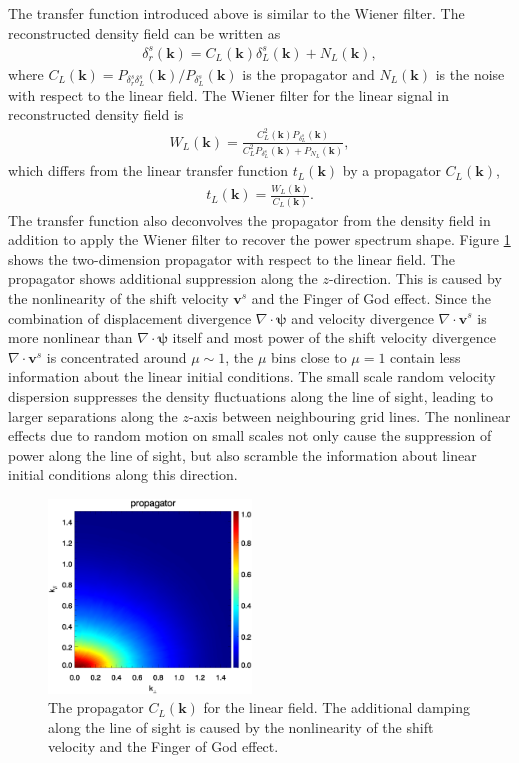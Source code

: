 \documentclass[aps,prd,twocolumn,superscriptaddress,groupedaddress,nofootinbib,amsfont]{revtex4}  %
\newcommand{\bea}{\begin{eqnarray}}
\newcommand{\eea}{\end{eqnarray}}
\newcommand{\bmp}{\bm{\psi}}
\newcommand{\bmv}{\bm{v}}
\newcommand{\bmk}{\bm{k}}
\begin{document}
The transfer function introduced above is similar to the Wiener filter. 
The reconstructed density field can be written as 
\bea
\delta_r^s(\bmk)=C_L(\bmk)\delta_L^s(\bmk)+N_L(\bmk),
\eea
where $C_L(\bmk)=P_{\delta_r^s\delta_L^s}(\bmk)/P_{\delta_L^s}(\bmk)$ is the 
propagator and $N_L(\bmk)$ is the noise with respect to the linear field. 
The Wiener filter for the linear signal in reconstructed density field is 
\bea
W_L(\bmk)=\frac{C^2_L(\bmk)P_{\delta_L^s}(\bmk)}{C_L^2P_{\delta^s_L}(\bmk)+P_{N_L}(\bmk)},
\eea
which differs from the linear transfer function $t_L(\bmk)$ by a propagator 
$C_L(\bmk)$,
\bea
t_L(\bmk)=\frac{W_L(\bmk)}{C_L(\bmk)}.
\eea
The transfer function also deconvolves the propagator from the density field 
in addition to apply the Wiener filter to recover the power spectrum shape.
Figure \ref{fig:tf_Ls} shows the two-dimension propagator with respect to the
linear field. 
The propagator shows additional suppression along the $z$-direction. 
This is caused by the nonlinearity of the shift velocity $\bmv^s$ and the Finger of God effect. Since the combination of displacement divergence $\nabla\cdot\bmp$ and velocity divergence $\nabla\cdot\bmv^s$ is more nonlinear than $\nabla\cdot\bmp$ itself and most power of the shift velocity divergence $\nabla\cdot\bmv^s$ is concentrated around $\mu\sim1$, the $\mu$ bins close to $\mu=1$ contain
less information about the linear initial conditions.
The small scale random velocity dispersion suppresses the density fluctuations
along the line of sight, leading to larger separations along the $z$-axis 
between neighbouring grid lines. 
The nonlinear effects due to random motion on small scales not only cause the 
suppression of power along the line of sight, but also scramble the information
about linear initial conditions along this direction. 

\begin{figure}[tbp]
\begin{center}
\includegraphics[width=0.48\textwidth]{0.000transf-the_deltaRsxLs_4x.eps}
\end{center}
\vspace{-0.7cm}
\caption{The propagator $C_L(\bmk)$ for the linear field. The additional damping
along the line of sight is caused by the nonlinearity of the shift velocity and the Finger of God effect.}
\label{fig:tf_Ls}
\end{figure}
\end{document}
